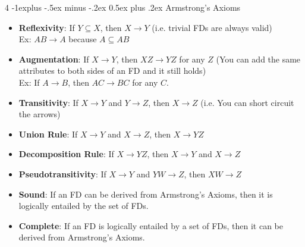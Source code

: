 \documentclass[10pt, landscape]{article}
\makeatletter
\renewcommand{\subsection}{\@startsection{subsection}{2}{0mm}%
  {-1explus -.5ex minus -.2ex}%
  {0.5ex plus .2ex}%
{\normalfont\normalsize\bfseries}}
\makeatother
\begin{document}
\begin{multicols*}{4}
  \subsection{Armstrong's Axioms}
  \begin{itemize}
    \item \textbf{Reflexivity}: If $Y \subseteq X$, then $X \rightarrow Y$ (i.e. trivial FDs are always valid)\\
    Ex: $AB \rightarrow A$ because $A \subseteq AB$
    \item \textbf{Augmentation}: If $X \rightarrow Y$, then $XZ \rightarrow YZ$ for any $Z$ (You can add the same attributes to both sides of an FD and it still holds)\\
    Ex: If $A \rightarrow B$, then $AC \rightarrow BC$ for any $C$.
    \item \textbf{Transitivity}: If $X \rightarrow Y$ and $Y \rightarrow Z$, then $X \rightarrow Z$ (i.e. You can short circuit the arrows)
    \item \textbf{Union Rule}: If $X \rightarrow Y$ and $X \rightarrow Z$, then $X \rightarrow YZ$
    \item \textbf{Decomposition Rule}: If $X \rightarrow YZ$, then $X \rightarrow Y$ and $X \rightarrow Z$
    \item \textbf{Pseudotransitivity}: If $X \rightarrow Y$ and $YW \rightarrow Z$, then $XW \rightarrow Z$
    \item \textbf{Sound}: If an FD can be derived from Armstrong's Axioms, then it is logically entailed by the set of FDs.
    \item \textbf{Complete}: If an FD is logically entailed by a set of FDs, then it can be derived from Armstrong's Axioms.
  \end{itemize}


\end{multicols*}
\end{document}
